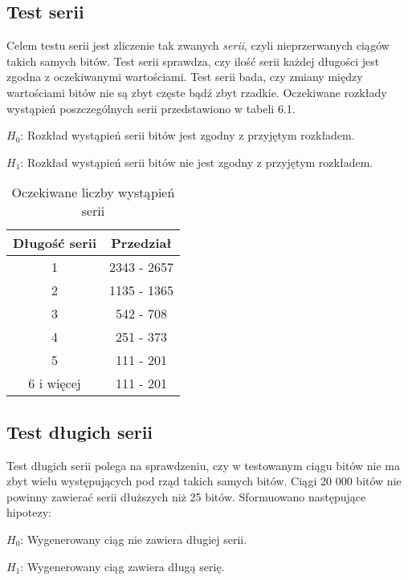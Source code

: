 \subsection{Test serii}
Celem testu serii jest zliczenie tak zwanych \textit{serii}, czyli nieprzerwanych ciągów takich samych bitów. Test serii
sprawdza, czy ilość serii każdej długości jest zgodna z oczekiwanymi wartościami. Test serii bada, czy zmiany między 
wartościami bitów nie są zbyt częste bądź zbyt rzadkie. Oczekiwane rozkłady wystąpień poszczególnych serii przedstawiono
w tabeli 6.1.
\par \begin{math} H_0 \end{math}: Rozkład wystąpień serii bitów jest zgodny z przyjętym rozkładem.
\par \begin{math} H_1 \end{math}: Rozkład wystąpień serii bitów nie jest zgodny z przyjętym rozkładem.
\begin{table}[h]
    \centering
    \caption{Oczekiwane liczby wystąpień serii}
    \begin{tabular}{|c|c|} 
        \hline
        Długość serii & Przedział \\
        \hline
        1 & 2343 - 2657 \\
        \hline
        2 & 1135 - 1365 \\
        \hline
        3 & 542 - 708 \\
        \hline
        4 & 251 - 373 \\
        \hline
        5 & 111 - 201 \\
        \hline
        6 i więcej & 111 - 201 \\
        \hline  
    \end{tabular} 
\end{table}   
\subsection{Test długich serii}
Test długich serii polega na sprawdzeniu, czy w testowanym ciągu bitów nie ma zbyt wielu występujących pod rząd takich 
samych bitów. Ciągi 20 000 bitów nie powinny zawierać serii dłuższych niż 25 bitów. Sformuowano następujące hipotezy:
\par \begin{math} H_0 \end{math}: Wygenerowany ciąg nie zawiera długiej serii.
\par \begin{math} H_1 \end{math}: Wygenerowany ciąg zawiera długą serię.

